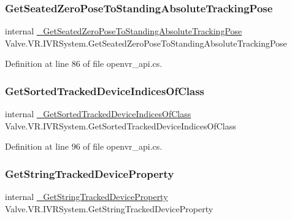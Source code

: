 \subsubsection{\texorpdfstring{GetSeatedZeroPoseToStandingAbsoluteTrackingPose}{GetSeatedZeroPoseToStandingAbsoluteTrackingPose}}
{\footnotesize\ttfamily internal \mbox{\hyperlink{struct_valve_1_1_v_r_1_1_i_v_r_system_af45048703eb614b2aa0e3a306838b131}{\+\_\+\+Get\+Seated\+Zero\+Pose\+To\+Standing\+Absolute\+Tracking\+Pose}} Valve.\+V\+R.\+I\+V\+R\+System.\+Get\+Seated\+Zero\+Pose\+To\+Standing\+Absolute\+Tracking\+Pose}



Definition at line 86 of file openvr\+\_\+api.\+cs.

\mbox{\label{struct_valve_1_1_v_r_1_1_i_v_r_system_a4eda6be881ec8440960d130834f70e59}} 
\subsubsection{\texorpdfstring{GetSortedTrackedDeviceIndicesOfClass}{GetSortedTrackedDeviceIndicesOfClass}}
{\footnotesize\ttfamily internal \mbox{\hyperlink{struct_valve_1_1_v_r_1_1_i_v_r_system_acb35a55e60800abca1d3216ba5c3b90e}{\+\_\+\+Get\+Sorted\+Tracked\+Device\+Indices\+Of\+Class}} Valve.\+V\+R.\+I\+V\+R\+System.\+Get\+Sorted\+Tracked\+Device\+Indices\+Of\+Class}



Definition at line 96 of file openvr\+\_\+api.\+cs.

\mbox{\label{struct_valve_1_1_v_r_1_1_i_v_r_system_a333164a121dcf6dd2496d237c2476784}} 
\subsubsection{\texorpdfstring{GetStringTrackedDeviceProperty}{GetStringTrackedDeviceProperty}}
{\footnotesize\ttfamily internal \mbox{\hyperlink{struct_valve_1_1_v_r_1_1_i_v_r_system_a6dec2a7ad8cb675cbc12248da723827b}{\+\_\+\+Get\+String\+Tracked\+Device\+Property}} Valve.\+V\+R.\+I\+V\+R\+System.\+Get\+String\+Tracked\+Device\+Property}



